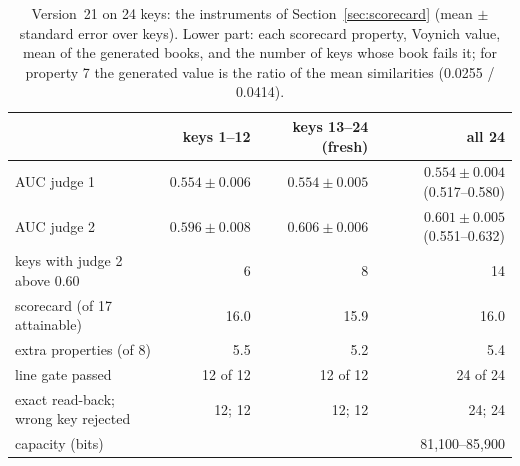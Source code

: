 \begin{table}[htbp]
\centering\footnotesize
\caption{Version~21 on 24 keys: the instruments of Section~\ref{sec:scorecard} (mean $\pm$ standard error over keys).
Lower part: each scorecard property, Voynich value, mean of the generated books, and the number of keys whose book fails
it; for property 7 the generated value is the ratio of the mean similarities (0.0255 / 0.0414).}
\label{tab:results}
\begin{tabularx}{\linewidth}{Yrrr}
\toprule
 & keys 1--12 & keys 13--24 (fresh) & all 24 \\
\midrule
AUC judge 1 & $0.554 \pm 0.006$ & $0.554 \pm 0.005$ & $0.554 \pm 0.004$ (0.517--0.580) \\
AUC judge 2 & $0.596 \pm 0.008$ & $0.606 \pm 0.006$ & $0.601 \pm 0.005$ (0.551--0.632) \\
keys with judge 2 above 0.60 & 6 & 8 & 14 \\
scorecard (of 17 attainable) & 16.0 & 15.9 & 16.0 \\
extra properties (of 8) & 5.5 & 5.2 & 5.4 \\
line gate passed & 12 of 12 & 12 of 12 & 24 of 24 \\
exact read-back; wrong key rejected & 12; 12 & 12; 12 & 24; 24 \\
capacity (bits) & & & 81{,}100--85{,}900 \\
\bottomrule
\end{tabularx}


\end{table}
